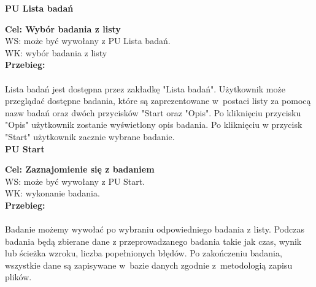 \documentclass[12pt, letterpaper]{article}
\begin{document}
		
		\textbf{PU Lista badań}
		
		\quad
		
		\textbf{Cel: Wybór badania z listy}\\
		
		WS: może być wywołany z PU Lista badań.\\
		
		WK: wybór badania z listy\\
		
		\textbf{Przebieg:}
\paragraph{}Lista badań jest dostępna przez zakładkę "Lista badań". Użytkownik może przeglądać dostępne badania, które są zaprezentowane w~postaci listy za pomocą nazw badań oraz dwóch przycisków "Start oraz "Opis". Po kliknięciu przycisku "Opis" użytkownik zostanie wyświetlony opis badania. Po kliknięciu w przycisk "Start" użytkownik zacznie wybrane badanie.\\
		
		
		\textbf{PU Start}
		
		\quad
		
		\textbf{Cel: Zaznajomienie się z badaniem}\\
		
		WS: może być wywołany z PU Start.\\
		
		WK: wykonanie badania.\\
		
		\textbf{Przebieg: }
\paragraph{}Badanie możemy wywołać po wybraniu odpowiedniego badania z listy. Podczas badania będą zbierane dane z przeprowadzanego badania takie jak czas, wynik lub ścieżka wzroku, liczba popełnionych błędów. Po zakończeniu badania, wszystkie dane są zapisywane w~bazie danych zgodnie z~metodologią zapisu plików.\\
		 
		
\end{document}
